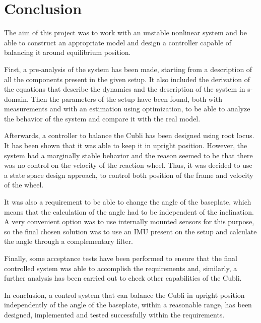 \chapter{Conclusion}

The aim of this project was to work with an unstable nonlinear system and be able to construct an appropriate model and design a controller capable of balancing it around equilibrium position.

First, a pre-analysis of the system has been made, starting from a description of all the components present in the given setup. It also included the derivation of the equations that describe the dynamics and the description of the system in s-domain. Then the parameters of the setup have been found, both with measurements and with an estimation using optimization, to be able to analyze the behavior of the system and compare it with the real model.

Afterwards, a controller to balance the Cubli has been designed using root locus. It has been shown that it was able to keep it in upright position. However, the system had a marginally stable behavior and the reason seemed to be that there was no control on the velocity of the reaction wheel. Thus, it was decided to use a state space design approach, to control both position of the frame and velocity of the wheel.

It was also a requirement to be able to change the angle of the baseplate, which means that the calculation of the angle had to be independent of the inclination. A very convenient option was to use internally mounted sensors for this purpose, so the final chosen solution was to use an IMU present on the setup and calculate the angle through a complementary filter.

Finally, some acceptance tests have been performed to ensure that the final controlled system was able to accomplish the requirements and, similarly, a further analysis has been carried out to check other capabilities of the Cubli.

In conclusion, a control system that can balance the Cubli in upright position independently of the angle of the baseplate, within a reasonable range, has been designed, implemented and tested successfully within the requirements.



